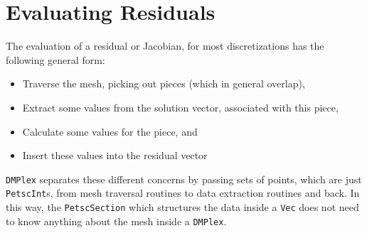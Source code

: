 \section{Evaluating Residuals} 

The evaluation of a residual or Jacobian, for most discretizations has the following general form:
\begin{itemize}
  \item Traverse the mesh, picking out pieces (which in general overlap),

  \item Extract some values from the solution vector, associated with this piece,

  \item Calculate some values for the piece, and

  \item Insert these values into the residual vector
\end{itemize}
\lstinline{DMPlex} separates these different concerns by passing sets of points, which are just \lstinline{PetscInt}s, from mesh traversal
routines to data extraction routines and back. In this way, the \lstinline{PetscSection} which structures the data inside a \lstinline{Vec} does
not need to know anything about the mesh inside a \lstinline{DMPlex}.

